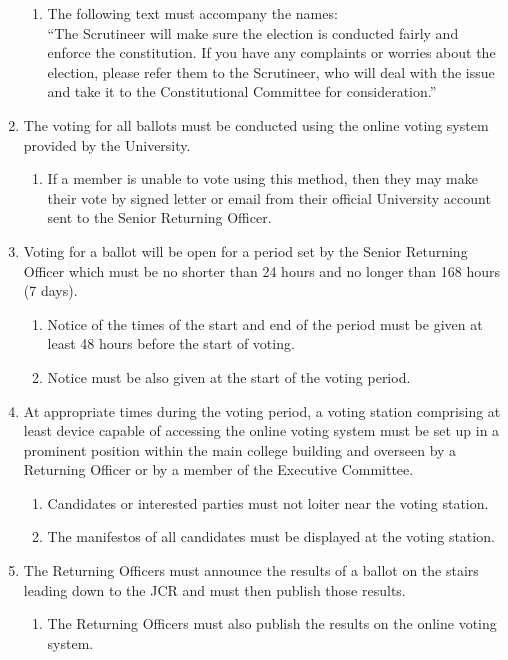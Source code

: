 \documentclass[12pt]{article}
\begin{document}
\begin{enumerate}
    \begin{enumerate}
        \item The following text must accompany the names:\\
        ``\textrm{The Scrutineer will make sure the election is conducted fairly and enforce the constitution. If you have any complaints or worries about the election, please refer them to the Scrutineer, who will deal with the issue and take it to the Constitutional Committee for consideration.}''
    \end{enumerate}
    \item The voting for all ballots must be conducted using the online voting system provided by the University.
    \begin{enumerate}
        \item If a member is unable to vote using this method, then they may make their vote by signed letter or email from their official University account sent to the Senior Returning Officer.
    \end{enumerate}
    \item Voting for a ballot will be open for a period set by the Senior Returning Officer which must be no shorter than 24 hours and no longer than 168 hours (7 days).
    \begin{enumerate}
        \item Notice of the times of the start and end of the period must be given at least 48 hours before the start of voting.
        \item Notice must be also given at the start of the voting period.
    \end{enumerate}
    \item At appropriate times during the voting period, a voting station comprising at least device capable of accessing the online voting system must be set up in a prominent position within the main college building and overseen by a Returning Officer or by a member of the Executive Committee.
    \begin{enumerate}
        \item Candidates or interested parties must not loiter near the voting station.
        \item The manifestos of all candidates must be displayed at the voting station.
    \end{enumerate}
    \item The Returning Officers must announce the results of a ballot on the stairs leading down to the JCR and must then publish those results.
    \begin{enumerate}
        \item The Returning Officers must also publish the results on the online voting system.
    \end{enumerate}

\end{enumerate}
\end{document}
